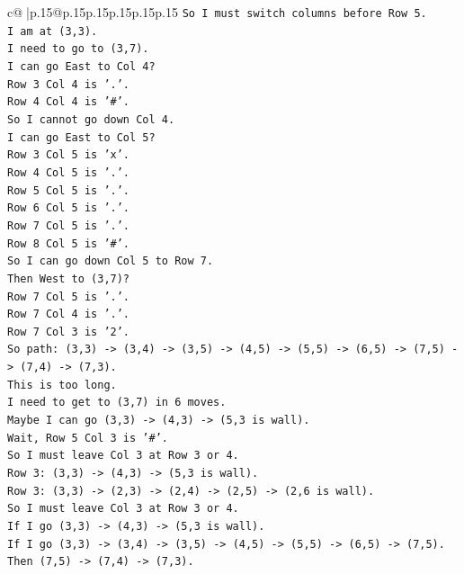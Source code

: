 \documentclass{article}
\begin{document}
{\begin{supertabular}{c@{$\;$}|p{.15\linewidth}@{}p{.15\linewidth}p{.15\linewidth}p{.15\linewidth}p{.15\linewidth}p{.15\linewidth}}
{{{\texttt{So I must switch columns before Row 5.} \\
\texttt{I am at (3,3).} \\
\texttt{I need to go to (3,7).} \\
\texttt{I can go East to Col 4?} \\
\texttt{Row 3 Col 4 is '.'.} \\
\texttt{Row 4 Col 4 is '\#'.} \\
\texttt{So I cannot go down Col 4.} \\
\texttt{I can go East to Col 5?} \\
\texttt{Row 3 Col 5 is 'x'.} \\
\texttt{Row 4 Col 5 is '.'.} \\
\texttt{Row 5 Col 5 is '.'.} \\
\texttt{Row 6 Col 5 is '.'.} \\
\texttt{Row 7 Col 5 is '.'.} \\
\texttt{Row 8 Col 5 is '\#'.} \\
\texttt{So I can go down Col 5 to Row 7.} \\
\texttt{Then West to (3,7)?} \\
\texttt{Row 7 Col 5 is '.'.} \\
\texttt{Row 7 Col 4 is '.'.} \\
\texttt{Row 7 Col 3 is '2'.} \\
\texttt{So path: (3,3) {-}> (3,4) {-}> (3,5) {-}> (4,5) {-}> (5,5) {-}> (6,5) {-}> (7,5) {-}> (7,4) {-}> (7,3).} \\
\texttt{This is too long.} \\
\texttt{I need to get to (3,7) in 6 moves.} \\
\texttt{Maybe I can go (3,3) {-}> (4,3) {-}> (5,3 is wall).} \\
\texttt{Wait, Row 5 Col 3 is '\#'.} \\
\texttt{So I must leave Col 3 at Row 3 or 4.} \\
\texttt{Row 3: (3,3) {-}> (4,3) {-}> (5,3 is wall).} \\
\texttt{Row 3: (3,3) {-}> (2,3) {-}> (2,4) {-}> (2,5) {-}> (2,6 is wall).} \\
\texttt{So I must leave Col 3 at Row 3 or 4.} \\
\texttt{If I go (3,3) {-}> (4,3) {-}> (5,3 is wall).} \\
\texttt{If I go (3,3) {-}> (3,4) {-}> (3,5) {-}> (4,5) {-}> (5,5) {-}> (6,5) {-}> (7,5).} \\
\texttt{Then (7,5) {-}> (7,4) {-}> (7,3).} \\
}}}
\end{supertabular}}
\end{document}
